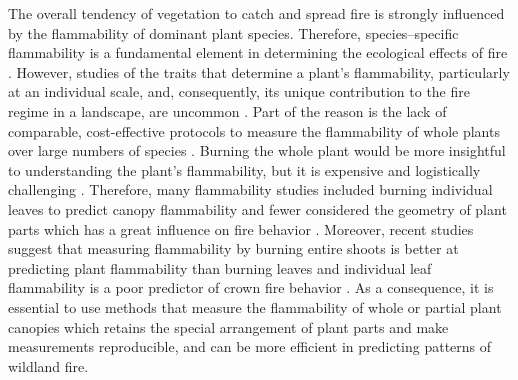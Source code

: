 \documentclass{ttuthes2007}
\begin{document}
The overall tendency of vegetation to catch and spread fire is strongly influenced by the flammability of dominant plant species. Therefore, species--specific flammability is a fundamental element in determining the ecological effects of fire \citep{bond1995kill, lavorel2002predicting, bond2005fire, wyse2018shoot}. However, studies of the traits that determine a plant's flammability, particularly at an individual scale, and, consequently, its unique contribution to the fire regime in a landscape, are uncommon \citep{jaureguiberry2011device, schwilk2015dimensions, pausas2017flammability}. Part of the reason is the lack of comparable, cost-effective protocols to measure the flammability of whole plants over large numbers of species \citep{jaureguiberry2011device}. Burning the whole plant would be more insightful to understanding the plant's flammability, but it is expensive and logistically challenging \citep{jaureguiberry2011device, pausasandmoi2012flammability}. Therefore, many flammability studies included burning individual leaves to predict canopy flammability and fewer considered the geometry of plant parts which has a great influence on fire behavior \citep{schwilk2003flammability, madrigal2012evaluation, pausas2012firesulex, calitz2015investigating, gao2018grass}. Moreover, recent studies suggest that measuring flammability by burning entire shoots is better at predicting plant flammability than burning leaves \citep{alam2020shoot} and individual leaf flammability is a poor predictor of crown fire behavior \citep{fernandes2012plant}. As a consequence, it is essential to use methods that measure the flammability of whole or partial plant canopies which retains the special arrangement of plant parts and make measurements reproducible, and can be more efficient in predicting %
patterns of wildland fire.



\end{document}
